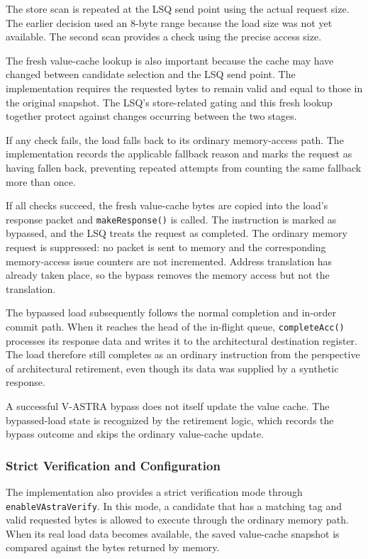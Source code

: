 The store scan is repeated at the LSQ send point using the
actual request size. The earlier decision used an 8-byte
range because the load size was not yet available. The second
scan provides a check using the precise access size.

The fresh value-cache lookup is also important because the cache may
have changed between candidate selection and the LSQ send
point. The implementation requires the requested bytes to
remain valid and equal to those in the original snapshot.
The LSQ's store-related gating and this fresh lookup together
protect against changes occurring between the two stages.

If any check fails, the load falls back to its ordinary
memory-access path. The implementation records the applicable
fallback reason and marks the request as having fallen back,
preventing repeated attempts from counting the same fallback
more than once.

If all checks succeed, the fresh value-cache bytes are copied into
the load's response packet and \texttt{makeResponse()} is
called. The instruction is marked as bypassed, and the LSQ
treats the request as completed. The ordinary memory request
is suppressed: no packet is sent to memory and the corresponding
memory-access issue counters are not incremented. Address
translation has already taken place, so the bypass removes the
memory access but not the translation.

The bypassed load subsequently follows the normal completion
and in-order commit path. When it reaches the head of the
in-flight queue, \texttt{completeAcc()} processes its response
data and writes it to the architectural destination register. The load therefore still completes
as an ordinary instruction from the perspective of architectural
retirement, even though its data was supplied by a synthetic
response.

A successful V-ASTRA bypass does not itself update the value cache.
The bypassed-load state is recognized by the retirement logic,
which records the bypass outcome and skips the ordinary value-cache
update.

\subsubsection{Strict Verification and Configuration}

The implementation also provides a strict verification mode
through \texttt{enableVAstraVerify}. In this mode, a candidate
that has a matching tag and valid requested bytes is allowed
to execute through the ordinary memory path. When its real
load data becomes available, the saved value-cache snapshot is compared
against the bytes returned by memory.

